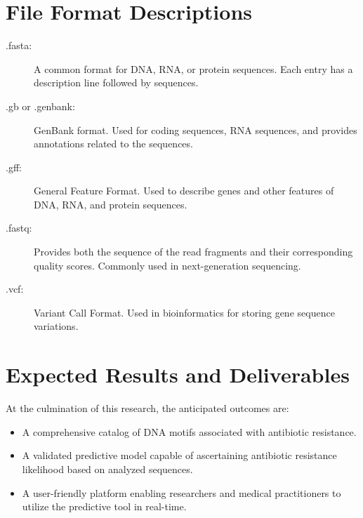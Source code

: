 \documentclass[12pt]{article}
\begin{document}
\section{File Format Descriptions}
\begin{description}
    \item[.fasta:] A common format for DNA, RNA, or protein sequences. Each entry has a description line followed by sequences.
    \item[.gb or .genbank:] GenBank format. Used for coding sequences, RNA sequences, and provides annotations related to the sequences.
    \item[.gff:] General Feature Format. Used to describe genes and other features of DNA, RNA, and protein sequences.
    \item[.fastq:] Provides both the sequence of the read fragments and their corresponding quality scores. Commonly used in next-generation sequencing.
    \item[.vcf:] Variant Call Format. Used in bioinformatics for storing gene sequence variations.
\end{description}

\section{Expected Results and Deliverables}
At the culmination of this research, the anticipated outcomes are:

\begin{itemize}
    \item A comprehensive catalog of DNA motifs associated with antibiotic resistance.
    \item A validated predictive model capable of ascertaining antibiotic resistance likelihood based on analyzed sequences.
    \item A user-friendly platform enabling researchers and medical practitioners to utilize the predictive tool in real-time.
\end{itemize}
\end{document}
